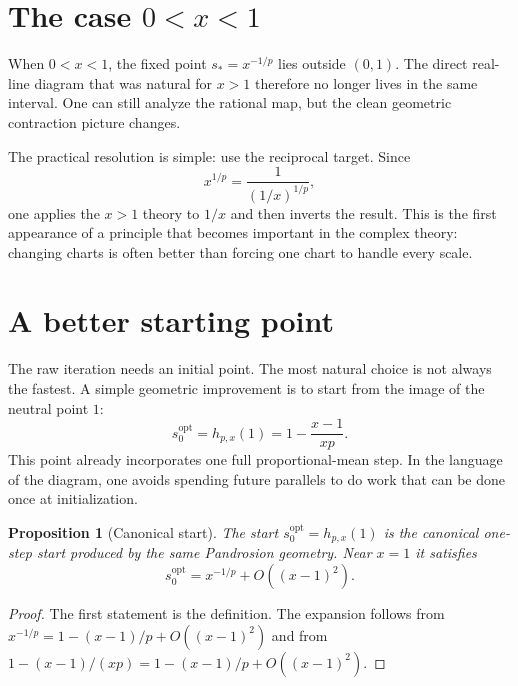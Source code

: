 \documentclass[11pt,a4paper]{article}
\theoremstyle{plain}
\newtheorem{proposition}[theorem]{Proposition}
\theoremstyle{definition}
\theoremstyle{remark}
\newcommand{\hp}{h_{p,x}}
\begin{document}
\section{The case \texorpdfstring{$0<x<1$}{0 < x < 1}}
\label{sec:x-less-one}

When $0<x<1$, the fixed point $s_*=x^{-1/p}$ lies outside $(0,1)$.  The direct
real-line diagram that was natural for $x>1$ therefore no longer lives in the
same interval.  One can still analyze the rational map, but the clean geometric
contraction picture changes.

The practical resolution is simple: use the reciprocal target.  Since
\[
  x^{1/p}=\frac{1}{(1/x)^{1/p}},
\]
one applies the $x>1$ theory to $1/x$ and then inverts the result.  This is the
first appearance of a principle that becomes important in the complex theory:
changing charts is often better than forcing one chart to handle every scale.

\section{A better starting point}
\label{sec:start}

The raw iteration needs an initial point.  The most natural choice is not
always the fastest.  A simple geometric improvement is to start from the image
of the neutral point $1$:
\begin{equation}
  s_0^{\mathrm{opt}}=\hp(1)=1-\frac{x-1}{xp}.
  \label{eq:startopt}
\end{equation}
This point already incorporates one full proportional-mean step.  In the
language of the diagram, one avoids spending future parallels to do work that
can be done once at initialization.

\begin{proposition}[Canonical start]
The start $s_0^{\mathrm{opt}}=\hp(1)$ is the canonical one-step start produced
by the same Pandrosion geometry.  Near $x=1$ it satisfies
\[
  s_0^{\mathrm{opt}}=x^{-1/p}+O((x-1)^2).
\]
\end{proposition}

\begin{proof}
The first statement is the definition.  The expansion follows from
$x^{-1/p}=1-(x-1)/p+O((x-1)^2)$ and from
$1-(x-1)/(xp)=1-(x-1)/p+O((x-1)^2)$.
\end{proof}
\end{document}
